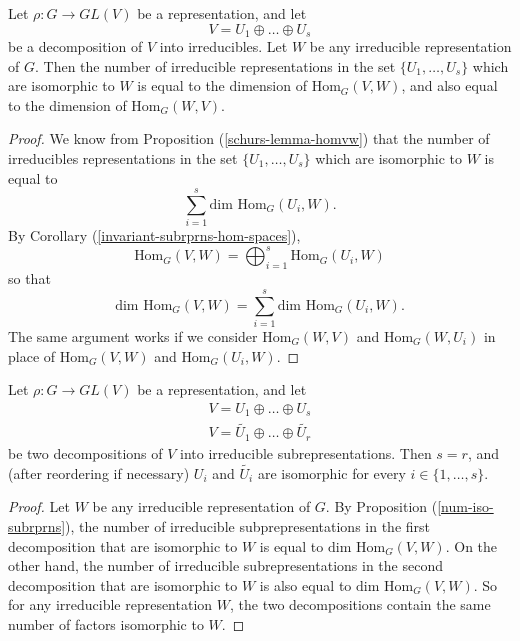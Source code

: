 \begin{prop}\label{num-iso-subrprns}
Let $\rho \colon G \to GL(V)$ be a representation, and let \[ V = U_1 \oplus \ldots \oplus U_s \] be a decomposition of $V$ into irreducibles.  Let $W$ be any irreducible representation of $G$.  Then the number of irreducible representations in the set  $ \{ U_1, \ldots, U_s \}$ which are isomorphic to $W$ is equal to the dimension of $\text{Hom}_G(V,W)$, and also equal to the dimension of $\text{Hom}_G(W,V)$.
\end{prop}
\begin{proof}
We know from Proposition (\ref{schurs-lemma-homvw}) that the number of irreducibles representations in the set  $ \{ U_1, \ldots, U_s \}$ which are isomorphic to $W$ is equal to \[ \sum_{i=1}^s \text{dim Hom}_G(U_i,W). \]
By Corollary (\ref{invariant-subrprns-hom-spaces}), \[ \text{Hom}_G(V,W) = \bigoplus_{i=1}^s \text{Hom}_G(U_i, W) \]
so that \[  \text{dim Hom}_G(V,W) = \sum_{i=1}^s \text{dim Hom}_G(U_i, W). \]
The same argument works if we consider $\text{Hom}_G(W,V)$ and $\text{Hom}_G(W,U_i)$ in place of $\text{Hom}_G(V,W)$ and $\text{Hom}_G(U_i,W)$.
\end{proof}

\begin{thm}
Let $\rho \colon G \to GL(V)$ be a representation, and let
\begin{align*}
V = U_1 \oplus \ldots \oplus U_s \\
V = \tilde{U_1} \oplus \ldots \oplus \tilde{U_r}
\end{align*}
be two decompositions of $V$ into irreducible subrepresentations.  Then $s = r$, and (after reordering if necessary) $U_i$ and $\tilde{U_i}$ are isomorphic for every $i \in \{1, \ldots, s\}$.
\end{thm}
\begin{proof}
Let $W$ be any irreducible representation of $G$.  By Proposition (\ref{num-iso-subrprns}), the number of irreducible subprepresentations in the first decomposition that are isomorphic to $W$ is equal to $\text{dim Hom}_G(V,W)$.  On the other hand, the number of irreducible subrepresentations in the second decomposition that are isomorphic to $W$ is also equal to $\text{dim Hom}_G(V,W)$.  So for any irreducible representation $W$, the two decompositions contain the same number of factors isomorphic to $W$.
\end{proof}


